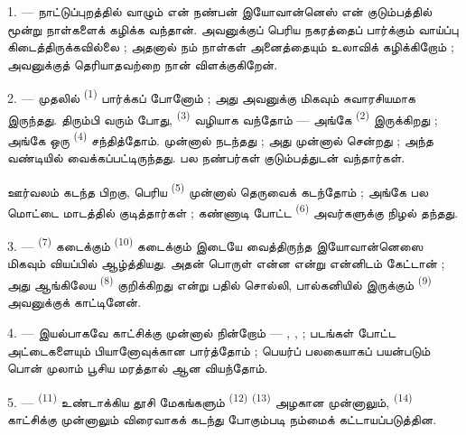 \VUsaut{4.0mm}
\VUsaut{3.0mm}

\VUsaut{3.0mm}

1. --- நாட்டுப்புறத்தில் வாழும் என் நண்பன் இயோவான்னெஸ் என் குடும்பத்தில்
மூன்று நாள்களைக் கழிக்க வந்தான்.  அவனுக்குப் பெரிய
நகரத்தைப் பார்க்கும் வாய்ப்பு கிடைத்திருக்கவில்லை ; அதனால் நம் நாள்கள்
அனைத்தையும் உலாவிக் கழிக்கிறோம் ; அவனுக்குத் தெரியாதவற்றை நான்
விளக்குகிறேன்.

2. --- முதலில்  \textsuperscript{(1)} பார்க்கப்
போனோம் ; அது அவனுக்கு மிகவும் சுவாரசியமாக இருந்தது. திரும்பி வரும்
போது,  \textsuperscript{(3)} வழியாக வந்தோம் — அங்கே
 \textsuperscript{(2)} இருக்கிறது ; அங்கே ஒரு
 \textsuperscript{(4)} சந்தித்தோம்.  முன்னால்  நடந்தது ; அது
 முன்னால் சென்றது ; அந்த வண்டியில்
 வைக்கப்பட்டிருந்தது. பல நண்பர்கள்  குடும்பத்துடன் வந்தார்கள்.

ஊர்வலம் கடந்த பிறகு, பெரிய 
\textsuperscript{(5)} முன்னால் தெருவைக் கடந்தோம் ; அங்கே பல
 மொட்டை மாடத்தில் 
குடித்தார்கள் ; கண்ணாடி போட்ட  \textsuperscript{(6)}
அவர்களுக்கு நிழல் தந்தது.

3. ---  \textsuperscript{(7)} கடைக்கும்
 \textsuperscript{(10)} கடைக்கும் இடையே
வைத்திருந்த  இயோவான்னெஸை மிகவும் வியப்பில்
ஆழ்த்தியது. அதன் பொருள் என்ன என்று என்னிடம் கேட்டான் ; அது ஆங்கிலேய
 \textsuperscript{(8)} குறிக்கிறது என்று பதில்
சொல்லி, பால்கனியில் இருக்கும் 
\textsuperscript{(9)} அவனுக்குக் காட்டினேன்.

\VUsaut{3.0mm}

4. --- இயல்பாகவே  காட்சிக்கு முன்னால்
நின்றோம் — , ,
 ;  படங்கள் போட்ட
அட்டைகளையும் பியானோவுக்கான  பார்த்தோம் ;
பெயர்ப் பலகையாகப் பயன்படும் பொன் முலாம் பூசிய மரத்தால் ஆன
 வியந்தோம்.

5. ---  \textsuperscript{(11)} உண்டாக்கிய
தூசி மேகங்களும்  \textsuperscript{(12)}
 \textsuperscript{(13)} அழகான
 முன்னாலும், 
\textsuperscript{(14)}  
காட்சிக்கு முன்னாலும் விரைவாகக் கடந்து போகும்படி நம்மைக்
கட்டாயப்படுத்தின.

